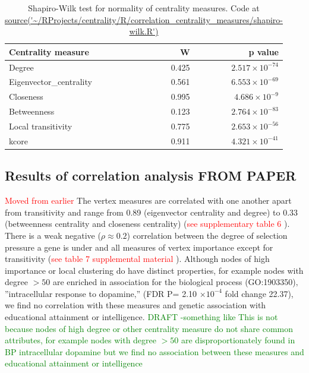 \begin{table}[ht]
\centering
\begin{tabular}{lrr}
  \hline
Centrality measure & W & p value \\ 
  \hline
Degree & 0.425 & $2.517 \times 10^{-74}$ \\ 
  Eigenvector\_centrality & 0.561 & $6.553 \times 10^{-69}$ \\ 
  Closeness & 0.995 & $4.686 \times 10^{-9}$ \\ 
  Betweenness & 0.123 & $2.764 \times 10^{-83}$ \\ 
  Local transitivity & 0.775 & $2.653 \times 10^{-56}$ \\ 
  kcore & 0.911 & $4.321 \times 10^{-41}$ \\ 
   \hline
\end{tabular}
\caption{Shapiro-Wilk test for normality of centrality measures. Code at \url{source('~/RProjects/centrality/R/correlation_centrality_measures/shapiro-wilk.R')}} 
\label{Table:Test for normality (Shapiro-Wilk) for centrality measures of PSP}
\end{table}

\subsection{Results of correlation analysis FROM PAPER}
\textcolor{red}{Moved from earlier}
The vertex measures are correlated with one another apart from transitivity and range from 0.89 (eigenvector centrality and degree) to 0.33 (betweenness centrality and closeness centrality) (\textcolor{red}{see supplementary table 6} ).
There is a weak negative ($\rho \approx 0.2$) correlation between 
the degree of selection pressure a gene is under and all measures of vertex importance except for transitivity (\textcolor{red}{see table 7 supplemental material} ).
Although nodes of high importance or local clustering do have distinct properties, for example nodes with degree $> 50$ are enriched in association for the biological process (GO:1903350)‚ ”intracellular response to dopamine‚” (FDR P= 2.10 $\times 10^{-4}$ fold change 22.37), we find no correlation with these measures and genetic association with educational attainment or intelligence. 
\textcolor{green}{DRAFT -something like This is not because nodes of high degree or other centrality measure do not share common attributes, for example nodes with degree $>50$ are disproportionately found in BP intracellular dopamine but we find no association between these measures and educational attainment or intelligence}





